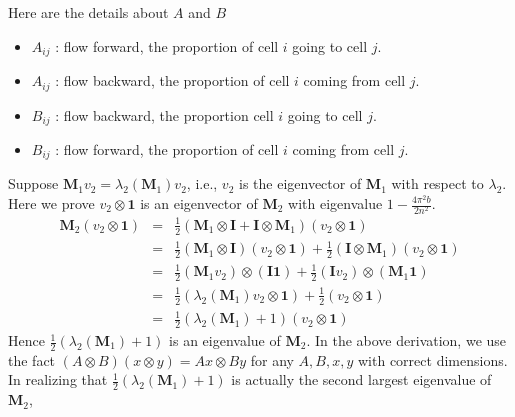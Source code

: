 Here are the details about $A$ and $B$
\begin{itemize}
\item $A_{ij}$ : flow forward, the proportion of cell $i$ going to cell $j$.\\
\item $A_{ij}$ : flow backward, the proportion of cell $i$ coming from cell $j$.\\
\item $B_{ij}$ : flow backward, the proportion  cell $i$ going to cell $j$. \\
\item $B_{ij}$ : flow forward, the proportion of cell $i$ coming from cell $j$. 
\end{itemize}

   Suppose $\mathbf{M}_1 v_2 = \lambda_{2}(\mathbf{M}_1)v_2$, i.e., $v_2$ is the eigenvector of $\mathbf{M}_1$ with respect to $\lambda_{2}$. Here we prove $v_2 \otimes \mathbf{1}$ is an eigenvector of $\mathbf{M}_2$ with eigenvalue $1-\frac{4\pi^{2}b}{2n^2}$.
\begin{eqnarray*}
  \mathbf{M}_2 (v_2 \otimes \mathbf{1}) &=& \frac{1}{2}\left( \mathbf{M}_{1}\otimes\mathbf{I}+ 
                                            \mathbf{I}\otimes \mathbf{M}_{1} \right)( v_2 \otimes \mathbf{1}) \\
                                        &=& \frac{1}{2}(\mathbf{M}_{1}\otimes\mathbf{I}) (v_2 \otimes \mathbf{1})+
                                            \frac{1}{2}(\mathbf{I}\otimes \mathbf{M}_{1}) (v_2 \otimes \mathbf{1})\\
                                        &=& \frac{1}{2}(\mathbf{M}_{1} v_2)\otimes(\mathbf{I} \mathbf{1}) +
                                            \frac{1}{2}(\mathbf{I} v_2)\otimes(\mathbf{M}_{1} \mathbf{1})\\
                                        &=& \frac{1}{2}(\lambda_{2}(\mathbf{M}_1) v_2 \otimes \mathbf{1}) +
                                            \frac{1}{2}( v_2 \otimes \mathbf{1})\\
                                        &=& \frac{1}{2}(\lambda_{2}(\mathbf{M}_1)+1)( v_2 \otimes \mathbf{1})
\end{eqnarray*}
Hence $\frac{1}{2}(\lambda_{2}(\mathbf{M}_1)+1)$ is an eigenvalue of $\mathbf{M}_2$. In the above derivation, we use the fact $ (A \otimes B)(x \otimes y) = Ax \otimes By $ for any $A,B,x,y$ with correct dimensions. In realizing that $\frac{1}{2}(\lambda_{2}(\mathbf{M}_1)+1)$ is actually the second largest eigenvalue of $\mathbf{M}_2$,

